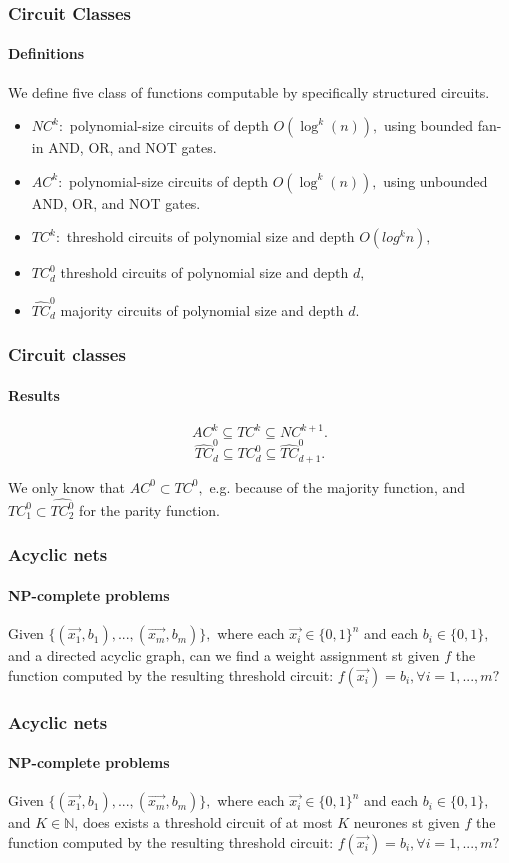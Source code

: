 \documentclass{beamer}
\begin{document}
\begin{frame}
\frametitle{Circuit Classes}
\framesubtitle{Definitions}	
	\begin{definition}
		We define five class of functions computable by specifically structured circuits.
		\begin{itemize}
			\item $NC^k: $ polynomial-size circuits of depth $ O(\log ^{k}(n)),$ using bounded fan-in AND, OR, and NOT gates.
			\item $AC^k: $ polynomial-size circuits of depth $ O(\log ^{k}(n)),$ using unbounded AND, OR, and NOT gates.
			\item $TC^k: $ threshold circuits of polynomial size and depth $O(log^k n),$
			\item $TC_d^0$ threshold circuits of polynomial size and depth $d,$
			\item $\widehat{TC}_d^0$ majority circuits of polynomial size and depth $d.$
		\end{itemize}
	\end{definition}
\end{frame}
\begin{frame}
	\frametitle{Circuit classes}
	\framesubtitle{Results}
	\begin{theorem}
		$$ AC^k \subseteq TC^k \subseteq NC^{k+1}. $$
		\[
			\widehat{TC}_d^0 \subseteq TC_d^0 \subseteq \widehat{TC}_{d+1}^0.
		\]
	\end{theorem}
We only know that $AC^0 \subset TC^0,$ e.g. because of the majority function, and $TC^0_1 \subset \widehat{TC^0_2}$ for the parity function.
\end{frame}

\begin{frame}
\frametitle{Acyclic nets}
\framesubtitle{NP-complete problems}
\begin{definition}
	Given $\{(\vec{x_1}, b_1),...,(\vec{x_m}, b_m)\},$ where each $\vec{x_i} \in \{0,1\}^n$ and each $b_i \in \{0, 1\},$ and a directed acyclic graph, can we find a weight assignment st given $f$ the function computed by the resulting threshold circuit: $f(\vec{x_i})=b_i, \forall i = 1,...,m ?$
\end{definition}
\end{frame}

\begin{frame}
\frametitle{Acyclic nets}
\framesubtitle{NP-complete problems}
	\begin{definition}
	Given $\{(\vec{x_1}, b_1),...,(\vec{x_m}, b_m)\},$ where each $\vec{x_i} \in \{0,1\}^n$ and each $b_i \in \{0, 1\},$ and $K \in \mathbb{N}$, does exists a threshold circuit of at most $K$ neurones st given $f$ the function computed by the resulting threshold circuit: $f(\vec{x_i})=b_i, \forall i = 1,...,m ?$
	\end{definition}
\end{frame}
\end{document}
